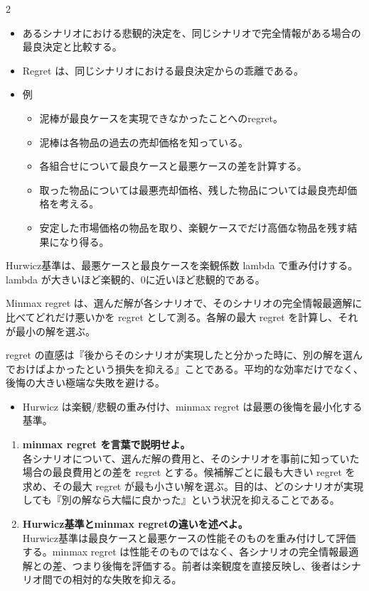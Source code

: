 \clearpage
{}
\begin{multicols}{2}\footnotesize\raggedcolumns
{}
\begin{itemize}
\item あるシナリオにおける悲観的決定を、同じシナリオで完全情報がある場合の最良決定と比較する。
\item Regret は、同じシナリオにおける最良決定からの乖離である。
\item 例
\begin{itemize}
\item 泥棒が最良ケースを実現できなかったことへのregret。
\item 泥棒は各物品の過去の売却価格を知っている。
\item 各組合せについて最良ケースと最悪ケースの差を計算する。
\item 取った物品については最悪売却価格、残した物品については最良売却価格を考える。
\item 安定した市場価格の物品を取り、楽観ケースでだけ高価な物品を残す結果になり得る。
\end{itemize}
\end{itemize}
Hurwicz基準は、最悪ケースと最良ケースを楽観係数 lambda で重み付けする。lambda が大きいほど楽観的、0に近いほど悲観的である。\par

Minmax regret は、選んだ解が各シナリオで、そのシナリオの完全情報最適解に比べてどれだけ悪いかを regret として測る。各解の最大 regret を計算し、それが最小の解を選ぶ。\par

regret の直感は『後からそのシナリオが実現したと分かった時に、別の解を選んでおけばよかったという損失を抑える』ことである。平均的な効率だけでなく、後悔の大きい極端な失敗を避ける。\par
{}
\begin{itemize}
\item Hurwicz は楽観/悲観の重み付け、minmax regret は最悪の後悔を最小化する基準。
\end{itemize}
\begin{enumerate}
\item \textbf{minmax regret を言葉で説明せよ。}\\各シナリオについて、選んだ解の費用と、そのシナリオを事前に知っていた場合の最良費用との差を regret とする。候補解ごとに最も大きい regret を求め、その最大 regret が最も小さい解を選ぶ。目的は、どのシナリオが実現しても『別の解なら大幅に良かった』という状況を抑えることである。
\item \textbf{Hurwicz基準とminmax regretの違いを述べよ。}\\Hurwicz基準は最良ケースと最悪ケースの性能そのものを重み付けして評価する。minmax regret は性能そのものではなく、各シナリオの完全情報最適解との差、つまり後悔を評価する。前者は楽観度を直接反映し、後者はシナリオ間での相対的な失敗を抑える。
\end{enumerate}
\end{multicols}

